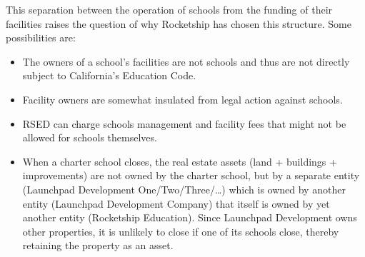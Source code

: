   This separation between the operation of schools from the funding of their facilities raises the question of why Rocketship has chosen this structure. Some possibilities are:
  \begin{itemize}
    \item The owners of a school's facilities are not schools and thus are not directly subject to California's Education Code.
    \item Facility owners are somewhat insulated from legal action against schools.
    \item RSED can charge schools management and facility fees that might not be allowed for schools themselves.
    \item When a charter school closes, the real estate assets (land + buildings + improvements) are not owned by the charter school, but by a separate entity (Launchpad Development One/Two/Three/\ldots) which is owned by another entity (Launchpad Development Company) that itself is owned by yet another entity (Rocketship Education). Since Launchpad Development owns other properties, it is unlikely to close if one of its schools close, thereby retaining the property as an asset.
  \end{itemize}
  
